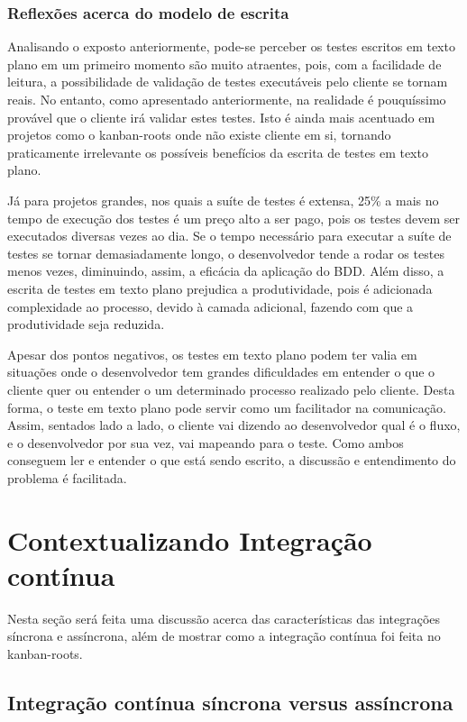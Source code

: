 \subsubsection{Reflexões acerca do modelo de escrita}
\label{ssub:reflexoes_bdd}

Analisando o exposto anteriormente, pode-se perceber os testes escritos em texto plano em um primeiro momento são muito atraentes, pois, com a facilidade de leitura, a possibilidade de validação de testes executáveis pelo cliente se tornam reais. No entanto, como apresentado anteriormente, na realidade é pouquíssimo provável que o cliente irá validar estes testes. Isto é ainda mais acentuado em projetos como o kanban-roots onde não existe cliente em si, tornando praticamente irrelevante os possíveis benefícios da escrita de testes em texto plano.

Já para projetos grandes, nos quais a suíte de testes é extensa, 25\% a mais no tempo de execução dos testes é um preço alto a ser pago, pois os testes devem ser executados diversas vezes ao dia. Se o tempo necessário para executar a suíte de testes se tornar demasiadamente longo, o desenvolvedor tende a rodar os testes menos vezes, diminuindo, assim, a eficácia da aplicação do BDD. Além disso, a escrita de testes em texto plano prejudica a produtividade, pois é adicionada complexidade ao processo, devido à camada adicional, fazendo com que a produtividade seja reduzida.

Apesar dos pontos negativos, os testes em texto plano podem ter valia em situações onde o desenvolvedor tem grandes dificuldades em entender o que o cliente quer ou entender o um determinado processo realizado pelo cliente. Desta forma, o teste em texto plano pode servir como um facilitador na comunicação. Assim, sentados lado a lado, o cliente vai dizendo ao desenvolvedor qual é o fluxo, e o desenvolvedor por sua vez, vai mapeando para o teste. Como ambos conseguem ler e entender o que está sendo escrito, a discussão e entendimento do problema é facilitada.


\section{Contextualizando Integração contínua}

Nesta seção será feita uma discussão acerca das características das integrações síncrona e assíncrona, além de mostrar como a integração contínua foi feita no kanban-roots.

\subsection{Integração contínua síncrona versus assíncrona}
\label{sub:sincrona_x_assincrona}

